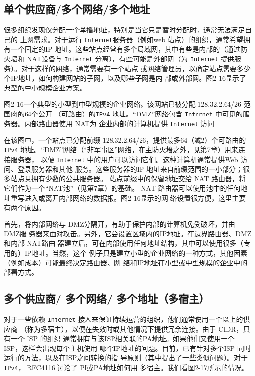 \subsection{单个供应商/多个网络/多个地址}

很多组织发现仅分配一个单播地址，特别是当它只是暂时分配时，通常无法满足自己的
上网需求。对于运行 \verb|Internet|服务器（例如web 站点）的组织，通常希望拥有一个固定的IP
地址。这些站点经常有多个局域网，其中有些是内部的（通过防火墙和 NAT设备与 \verb|Internet|
分离），有些可能是外部网（为 \verb|Internet| 提供服务）。对于这样的网络，通常需要有一个站点
或网络管理员，以确定站点需要多少个IP地址，如何构建网站的子网，以及哪些子网是内
部或外部网。图2-16显示了典型的中小规模企业方案。

图2-16一个典型的小型到中型规模的企业网络。该网站已被分配 128.32.2.64/26 范围肉的64个公开
（可路由）的\verb|IPv4| 地址。“DMZ”网络包含 \verb|Internet| 中可见的服务器。内部路由器使用 NAT为
企业内部的计算机提供 \verb|Internet| 访问

在该图中，一个站点已分配前缀 128.32.2.64/26，提供最多64（减2）个可路由的\verb|IPv4|
地址。“DMZ”网络（“非军事区”网络，在主防火墻之外，见第7章）用来连接服务器，
以便 \verb|Internet| 中的用户可以访问它们。这种计算机通常提供Web 访问、登录服务器和其他
服务。这些服务器的IP 地址来自前缀范围的一小部分；很多站点只拥有少数的公共服务器。
站点前缀中的保留地址交给 NAT 路由器，将它们作为一个“NAT池”（见第7章）的基础。
NAT 路由器可以使用池中的任何地址重写进入或离开内部网络的数据报。图2-16显示的网
络设置很方便，这里主要有两个原因。

首先，将内部网络与 DMZ分隔开，有助于保护内部的计算机免受破坏，并由 DMZ服
务器来面对攻击。另外，它会设置区域内的IP地址。在边界路由器、DMZ和内部 NAT路由
器建立后，可在内部使用任何地址结构，其中可以使用很多（专用的）IP地址。当然，这个
例子只是建立小型的企业网络的一种方式，其他因素（例如成本）可能最终决定路由器、网
络和IP地址在小型或中型规模的企业中的部署方式。

\subsection{多个供应商/ 多个网络/ 多个地址（多宿主）}
对于一些依赖 \verb|Internet| 接人来保证持续运营的组织，他们通常使用一个以上的供应商
（称为多宿主），以便在失效时或其他情况下提供冗余连接。由于 CIDR，只有一个 ISP 的组织
通常拥有与该ISP相关联的PA地址。如果他们又使用一个ISP，这样会出现每个主机使用
哪个IP地址的问题。目前，已有针对多个ISP 同时运行的方法，以及在ISP之间转换的指
导原则（其中提出了一些类似问题）。对于 \verb|IPv4|，\href{https://www.rfc-editor.org/rfc/rfc4116}{[RFC4116]}讨论了 PI或PA地址如何用
多宿主。我们看图2-17所示的情况。

